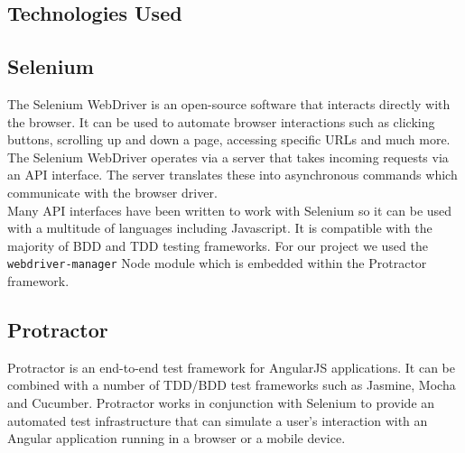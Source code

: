%
%

\subsection{Technologies Used}
\label{sec:technologies-used}

\subsection{Selenium}
\label{subsec:selenium}
The Selenium WebDriver is an open-source software that interacts directly with the browser. It can be used to automate browser interactions such as clicking buttons, scrolling up and down a page, accessing specific URLs and much more.
\\

The Selenium WebDriver operates via a server that takes incoming requests via an API interface. The server translates these into asynchronous commands which communicate with the browser driver.
\\

Many API interfaces have been written to work with Selenium so it can be used with a multitude of languages including Javascript. It is compatible with the majority of BDD and TDD testing frameworks. For our project we used the \texttt{webdriver-manager} Node module which is embedded within the Protractor framework.

\subsection{Protractor}
\label{subsec:protractor}
Protractor is an end-to-end test framework for AngularJS applications. It can be combined with a number of TDD/BDD test frameworks such as Jasmine, Mocha and Cucumber. Protractor works in conjunction with Selenium to provide an automated test infrastructure that can simulate a user’s interaction with an Angular application running in a browser or a mobile device.
\\

